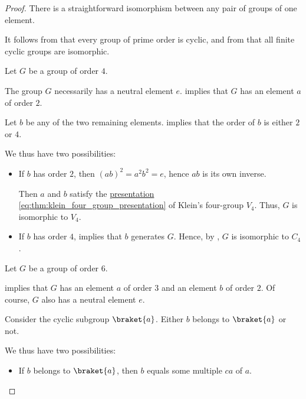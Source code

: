 \begin{proof}
   There is a straightforward isomorphism between any pair of groups of one element.

   It follows from  that every group of prime order is cyclic, and from  that all finite cyclic groups are isomorphic.

   Let \( G \) be a group of order \( 4 \).

  The group \( G \) necessarily has a neutral element \( e \).  implies that \( G \) has an element \( a \) of order \( 2 \).

  Let \( b \) be any of the two remaining elements.  implies that the order of \( b \) is either \( 2 \) or \( 4 \).

  We thus have two possibilities:
  \begin{itemize}
    \item If \( b \) has order \( 2 \), then \( (ab)^2 = a^2 b^2 = e \), hence \( ab \) is its own inverse.

    Then \( a \) and \( b \) satisfy the \hyperref[def:group_presentation]{presentation} \eqref{eq:thm:klein_four_group_presentation} of Klein's four-group \( V_4 \). Thus, \( G \) is isomorphic to \( V_4 \).

    \item If \( b \) has order \( 4 \),  implies that \( b \) generates \( G \). Hence, by , \( G \) is isomorphic to \( C_4 \).
  \end{itemize}

   Let \( G \) be a group of order \( 6 \).

   implies that \( G \) has an element \( a \) of order \( 3 \) and an element \( b \) of order \( 2 \). Of course, \( G \) also has a neutral element \( e \).

  Consider the cyclic subgroup \( \braket{ a } \). Either \( b \) belongs to \( \braket{ a } \) or not.

  We thus have two possibilities:
  \begin{itemize}
    \item If \( b \) belongs to \( \braket{ a } \), then \( b \) equals some multiple \( ca \) of \( a \).


\end{itemize}
\end{proof}
